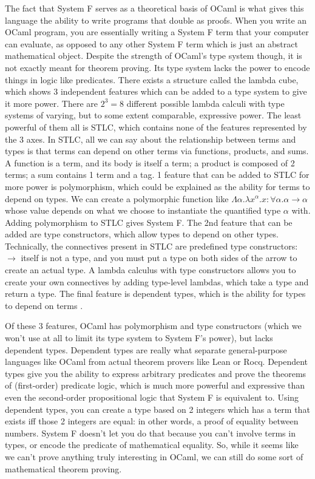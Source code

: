 \documentclass[12pt]{article}
\begin{document}
The fact that System F serves as a theoretical basis of OCaml is what gives this language the ability to write programs that double as proofs. When you write an OCaml program, you are essentially writing a System F term that your computer can evaluate, as opposed to any other System F term which is just an abstract mathematical object. Despite the strength of OCaml's type system though, it is not exactly meant for theorem proving. Its type system lacks the power to encode things in logic like predicates. There exists a structure called the lambda cube, which shows 3 independent features which can be added to a type system to give it more power. There are $2^3 = 8$ different possible lambda calculi with type systems of varying, but to some extent comparable, expressive power. The least powerful of them all is STLC, which contains none of the features represented by the 3 axes. In STLC, all we can say about the relationship between terms and types is that terms can depend on other terms via functions, products, and sums. A function is a term, and its body is itself a term; a product is composed of 2 terms; a sum contains 1 term and a tag. 1 feature that can be added to STLC for more power is polymorphism, which could be explained as the ability for terms to depend on types. We can create a polymorphic function like $\Lambda \alpha. \lambda x^\alpha. x: \forall \alpha. \alpha \to \alpha$ whose value depends on what we choose to instantiate the quantified type $\alpha$ with. Adding polymorphism to STLC gives System F. The 2nd feature that can be added are type constructors, which allow types to depend on other types. Technically, the connectives present in STLC are predefined type constructors: $\to$ itself is not a type, and you must put a type on both sides of the arrow to create an actual type. A lambda calculus with type constructors allows you to create your own connectives by adding type-level lambdas, which take a type and return a type. The final feature is dependent types, which is the ability for types to depend on terms \cite{sorensen}.

Of these 3 features, OCaml has polymorphism and type constructors (which we won't use at all to limit its type system to System F's power), but lacks dependent types. Dependent types are really what separate general-purpose languages like OCaml from actual theorem provers like Lean or Rocq. Dependent types give you the ability to express arbitrary predicates and prove the theorems of (first-order) predicate logic, which is much more powerful and expressive than even the second-order propositional logic that System F is equivalent to. Using dependent types, you can create a type based on 2 integers which has a term that exists iff those 2 integers are equal: in other words, a proof of equality between numbers. System F doesn't let you do that because you can't involve terms in types, or encode the predicate of mathematical equality. So, while it seems like we can't prove anything truly interesting in OCaml, we can still do some sort of mathematical theorem proving.
\end{document}
